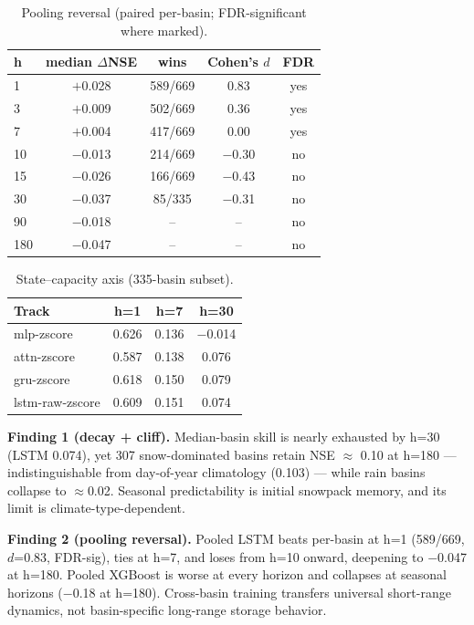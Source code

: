 \documentclass[11pt]{article}
\begin{document}
\begin{table}[t]
\centering\small
\caption{Pooling reversal (paired per-basin; FDR-significant where marked).}
\label{tab:pooling}
\begin{tabular}{lcccc}
\toprule
h & median $\Delta$NSE & wins & Cohen's $d$ & FDR \\
\midrule
1 & $+$0.028 & 589/669 & 0.83 & yes \\
3 & $+$0.009 & 502/669 & 0.36 & yes \\
7 & $+$0.004 & 417/669 & 0.00 & yes \\
10 & $-$0.013 & 214/669 & $-$0.30 & no \\
15 & $-$0.026 & 166/669 & $-$0.43 & no \\
30 & $-$0.037 & 85/335 & $-$0.31 & no \\
90 & $-$0.018 & -- & -- & no \\
180 & $-$0.047 & -- & -- & no \\
\bottomrule
\end{tabular}
\end{table}

\begin{table}[t]
\centering\small
\caption{State--capacity axis (335-basin subset).}
\label{tab:state}
\begin{tabular}{lccc}
\toprule
Track & h=1 & h=7 & h=30 \\
\midrule
mlp-zscore & 0.626 & 0.136 & $-$0.014 \\
attn-zscore & 0.587 & 0.138 & 0.076 \\
gru-zscore & 0.618 & 0.150 & 0.079 \\
lstm-raw-zscore & 0.609 & 0.151 & 0.074 \\
\bottomrule
\end{tabular}
\end{table}

\textbf{Finding 1 (decay + cliff).} Median-basin skill is nearly exhausted by
h=30 (LSTM 0.074), yet 307 snow-dominated basins retain NSE $\approx$ 0.10 at
h=180 --- indistinguishable from day-of-year climatology (0.103) --- while
rain basins collapse to $\approx$0.02. Seasonal predictability is initial
snowpack memory, and its limit is climate-type-dependent.

\textbf{Finding 2 (pooling reversal).} Pooled LSTM beats per-basin at h=1
(589/669, $d$=0.83, FDR-sig), ties at h=7, and loses from h=10 onward,
deepening to $-$0.047 at h=180. Pooled XGBoost is worse at every horizon and
collapses at seasonal horizons ($-$0.18 at h=180). Cross-basin training
transfers universal short-range dynamics, not basin-specific long-range
storage behavior.
\end{document}
